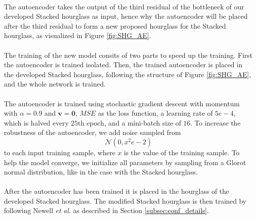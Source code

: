\documentclass[./main.tex]{subfiles}
\begin{document}
\\
The autoencoder takes the output of the third residual of the bottleneck of our developed Stacked hourglass as input, hence why the autoencoder will be placed after the third residual to form a new proposed hourglass for the Stacked hourglass, as visualized in Figure \ref{fig:SHG_AE}.
\\
\\
The training of the new model consits of two parts to speed up the training. First the autoencoder is trained isolated. Then, the trained autoencoder is placed in the developed Stacked hourglass, following the structure of Figure \ref{fig:SHG_AE}, and the whole network is trained.
\\
\\
The autoencoder is trained using stochastic gradient descent with momentum with $\alpha = 0.9$ and $\bm{v} = \bm{0}$, $MSE$ as the loss function, a learning rate of $5e-4$, which is halved every $25$th epoch, and a mini-batch size of $16$. To increase the robustness of the autoencoder, we add noise sampled from
$$\mathcal{N} \left(0, x^2e-2 \right)$$
to each input training sample, where $x$ is the value of the training sample. To help the model converge, we initialize all parameters by sampling from a Glorot normal distribution, like in the case with the Stacked hourglass.
\\
\\
After the autoencoder has been trained it is placed in the hourglass of the developed Stacked hourglass. The modified Stacked hourglass is then trained by following Newell \textit{et al.} \cite{Newell} as described in Section \ref{subsec:conf_details}.
\end{document}
